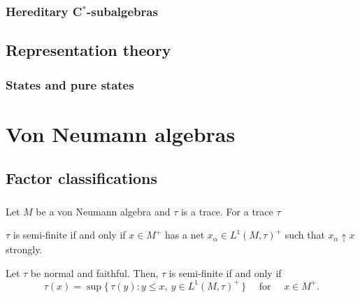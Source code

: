\documentclass{../note}
\begin{document}
\begin{prb}
\end{prb}



\section{Hereditary C$^*$-subalgebras}
\begin{prb}

\end{prb}

\chapter{Representation theory}
\section{States and pure states}



\chapter{}













\part{Von Neumann algebras}

\chapter{Factor classifications}

\section{}
\begin{prb}
Let $M$ be a von Neumann algebra and $\tau$ is a trace.
For a trace $\tau$
\begin{parts}
\item $\tau$ is semi-finite if and only if $x\in M^+$ has a net $x_\alpha\in L^1(M,\tau)^+$ such that $x_\alpha\uparrow x$ strongly.
\item Let $\tau$ be normal and faithful. Then, $\tau$ is semi-finite if and only if
\[\tau(x)=\sup\{\,\tau(y):y\le x,\ y\in L^1(M,\tau)^+\,\}\quad\text{ for }\quad x\in M^+.\]
\end{parts}
\end{prb}
\end{document}
